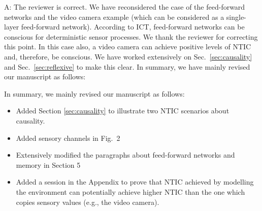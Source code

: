 \documentclass[utf8]{article}
\newenvironment{ans}  
    {\color{Black}\noindent A:}
    {~\newline}
\begin{document}
        \begin{ans}
        	The reviewer is correct. We have reconsidered the case of the feed-forward networks and the video camera example (which can be considered as a single-layer feed-forward network). According to ICT, feed-forward networks can be conscious for deterministic sensor processes. We thank the reviewer for correcting this point. In this case also, a video camera can achieve positive levels of NTIC and, therefore, be conscious. We have worked extensively on Sec.~\ref{sec:causality} and Sec.~\ref{sec:reflexive} to make this clear. In summary, we have mainly revised our manuscript as follows:
        	        	        
        	In summary, we mainly revised our manuscript as follows:
        	\begin{itemize}
        	    \item Added Section \ref{sec:causality} to illustrate two NTIC scenarios about causality. 
        	    \item Added sensory channels in Fig.~2
        	    \item Extensively modified the paragraphs about feed-forward networks and memory in Section 5
        	    \item Added a session in the Appendix to prove that NTIC achieved by modelling the environment can potentially achieve higher NTIC than the one which copies sensory values (e.g., the video camera).
        	\end{itemize}
        	
        	
        	
        	
		    

\end{ans}
\end{document}
